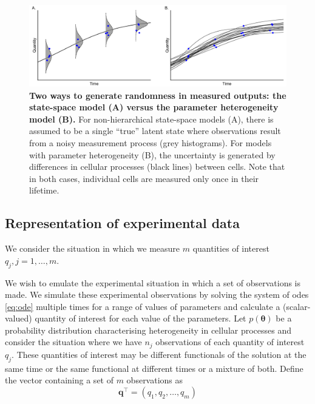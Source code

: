 \begin{figure}[H]
	\centerline{\includegraphics[width=\textwidth]{../figures/data_generation.pdf}}
	\caption{\textbf{Two ways to generate randomness in measured outputs: the state-space model (A) versus the parameter heterogeneity model (B).} For non-hierarchical state-space models (A), there is assumed to be a single ``true'' latent state where observations result from a noisy measurement process (grey histograms). For models with parameter heterogeneity (B), the uncertainty is generated by differences in cellular processes (black lines) between cells. Note that in both cases, individual cells are measured only once in their lifetime.}
	\label{fig:data_generation}
\end{figure}

\subsection{Representation of experimental data}

We consider the situation in which we measure $m$ quantities of interest $q_j, j=1, \dots, m$.

We wish to emulate the experimental situation in which a set of observations is made. We simulate these experimental observations by solving the system of odes \eqref{eq:ode} multiple times for a range of values of parameters and calculate a (scalar-valued) quantity of interest for each value of the parameters.  Let $p(\boldsymbol{\theta})$ be a probability distribution characterising heterogeneity in cellular processes and consider the situation where we have $n_j$ observations of each quantity of interest $q_j$. These quantities of interest may be different functionals of the solution at the same time or the same functional at different times or a mixture of both. Define the vector containing a set of $m$ observations as
\begin{equation}
\boldsymbol{q}^\top = \left( q_1, q_2, \dots, q_m \right)
\end{equation}

